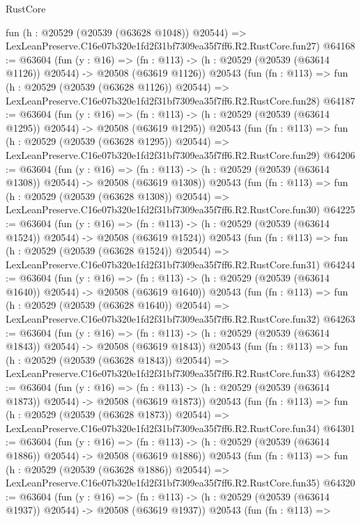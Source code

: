 \begin{lexlean}{RustCore}
\begin{coremodule}
    fun (h : @20529 (@20539 (@63628 @1048)) @20544) =>
    LexLeanPreserve.C16e07b320e1fd2f31bf7309ea35f7ff6.R2.RustCore.fun27)
@64168 := @63604
    (fun (y : @16) =>
    (fn : @113) -> (h : @20529 (@20539 (@63614 @1126)) @20544) -> @20508 (@63619 @1126))
    @20543
    (fun (fn : @113) =>
    fun (h : @20529 (@20539 (@63628 @1126)) @20544) =>
    LexLeanPreserve.C16e07b320e1fd2f31bf7309ea35f7ff6.R2.RustCore.fun28)
@64187 := @63604
    (fun (y : @16) =>
    (fn : @113) -> (h : @20529 (@20539 (@63614 @1295)) @20544) -> @20508 (@63619 @1295))
    @20543
    (fun (fn : @113) =>
    fun (h : @20529 (@20539 (@63628 @1295)) @20544) =>
    LexLeanPreserve.C16e07b320e1fd2f31bf7309ea35f7ff6.R2.RustCore.fun29)
@64206 := @63604
    (fun (y : @16) =>
    (fn : @113) -> (h : @20529 (@20539 (@63614 @1308)) @20544) -> @20508 (@63619 @1308))
    @20543
    (fun (fn : @113) =>
    fun (h : @20529 (@20539 (@63628 @1308)) @20544) =>
    LexLeanPreserve.C16e07b320e1fd2f31bf7309ea35f7ff6.R2.RustCore.fun30)
@64225 := @63604
    (fun (y : @16) =>
    (fn : @113) -> (h : @20529 (@20539 (@63614 @1524)) @20544) -> @20508 (@63619 @1524))
    @20543
    (fun (fn : @113) =>
    fun (h : @20529 (@20539 (@63628 @1524)) @20544) =>
    LexLeanPreserve.C16e07b320e1fd2f31bf7309ea35f7ff6.R2.RustCore.fun31)
@64244 := @63604
    (fun (y : @16) =>
    (fn : @113) -> (h : @20529 (@20539 (@63614 @1640)) @20544) -> @20508 (@63619 @1640))
    @20543
    (fun (fn : @113) =>
    fun (h : @20529 (@20539 (@63628 @1640)) @20544) =>
    LexLeanPreserve.C16e07b320e1fd2f31bf7309ea35f7ff6.R2.RustCore.fun32)
@64263 := @63604
    (fun (y : @16) =>
    (fn : @113) -> (h : @20529 (@20539 (@63614 @1843)) @20544) -> @20508 (@63619 @1843))
    @20543
    (fun (fn : @113) =>
    fun (h : @20529 (@20539 (@63628 @1843)) @20544) =>
    LexLeanPreserve.C16e07b320e1fd2f31bf7309ea35f7ff6.R2.RustCore.fun33)
@64282 := @63604
    (fun (y : @16) =>
    (fn : @113) -> (h : @20529 (@20539 (@63614 @1873)) @20544) -> @20508 (@63619 @1873))
    @20543
    (fun (fn : @113) =>
    fun (h : @20529 (@20539 (@63628 @1873)) @20544) =>
    LexLeanPreserve.C16e07b320e1fd2f31bf7309ea35f7ff6.R2.RustCore.fun34)
@64301 := @63604
    (fun (y : @16) =>
    (fn : @113) -> (h : @20529 (@20539 (@63614 @1886)) @20544) -> @20508 (@63619 @1886))
    @20543
    (fun (fn : @113) =>
    fun (h : @20529 (@20539 (@63628 @1886)) @20544) =>
    LexLeanPreserve.C16e07b320e1fd2f31bf7309ea35f7ff6.R2.RustCore.fun35)
@64320 := @63604
    (fun (y : @16) =>
    (fn : @113) -> (h : @20529 (@20539 (@63614 @1937)) @20544) -> @20508 (@63619 @1937))
    @20543
    (fun (fn : @113) =>

\end{coremodule}
\end{lexlean}
